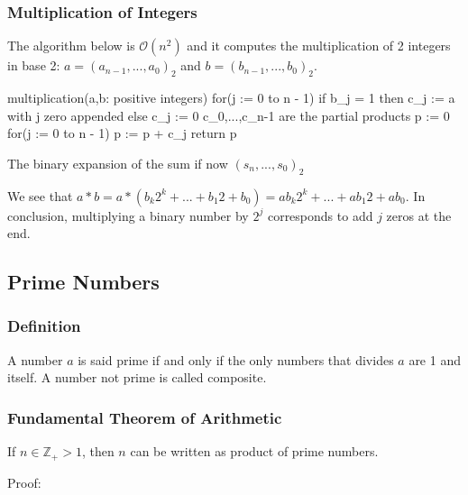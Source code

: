 \documentclass{article}
\begin{document}
\subsubsection{Multiplication of Integers} The algorithm below is $ \mathcal{O}(n^2) $ and it computes the multiplication of 2 integers in base 2: $ a = (a_{n-1},...,a_0)_2 $ and $ b = (b_{n-1},...,b_0)_2 $.
\begin{mylisting}
	multiplication(a,b: positive integers)
	for(j := 0 to n - 1)
		if b_j = 1 then c_j := a with j zero appended
		else c_j := 0
	{c_0,...,c_{n-1} are the partial products}
	p := 0
	for(j := 0 to n - 1)
		p := p + c_j
	return p	
\end{mylisting}
The binary expansion of the sum if now $ (s_n,...,s_0)_2 $

\begin{tcolorbox}
We see that $ a*b = a * (b_{k}2^{k} + ... + b_{1}2 + b_0) = ab_{k}2^{k} + ... + ab_{1}2 + ab_0 $. In conclusion, multiplying a binary number by $ 2^j $ corresponds to add $ j $ zeros at the end.
\end{tcolorbox}

\subsection{Prime Numbers}
\subsubsection{Definition} A number $ a $ is said prime if and only if the only numbers that divides $ a $ are 1 and itself. A number not prime is called composite.

\subsubsection{Fundamental Theorem of Arithmetic}
\begin{tcolorbox}[sharp corners, colback=green!30, colframe=green!80!blue, title=Decomposition of Numbers in primes product]
If $ n \in \mathbb{Z_+} > 1 $, then $ n $ can be written as product of prime numbers.
\end{tcolorbox}
Proof:
\end{document}

